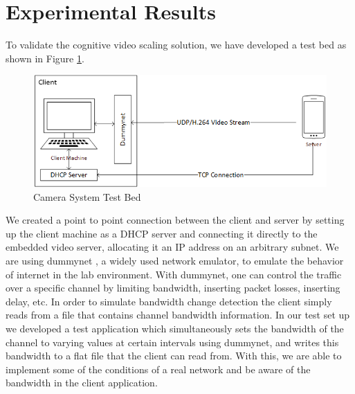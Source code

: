 \section{Experimental Results}
\label{sec:Results}

To validate the cognitive video scaling solution, we have developed a test bed as shown in Figure \ref{fig:Testbed}.
\begin{figure}[H]
\centering
\includegraphics[width=0.7\linewidth]{images/CameraSystemTestbed.png}
\caption{Camera System Test Bed}
\label{fig:Testbed}
\end{figure}
We created a point to point connection between the client and server by setting up the client machine as a DHCP server and connecting it directly to the embedded video server, allocating it an IP address on an arbitrary subnet. We are using dummynet , a widely used network emulator, to emulate the behavior of internet in the lab environment. With dummynet, one can control the traffic over a specific channel by limiting bandwidth, inserting packet losses, inserting delay, etc. In order to simulate bandwidth change detection the client simply reads from a file that contains channel bandwidth information. In our test set up we developed a test application which simultaneously sets the bandwidth of the channel to varying values at certain intervals using dummynet, and writes this bandwidth to a flat file that the client can read from. With this, we are able to implement some of the conditions of a real network and be aware of the bandwidth in the client application. 

